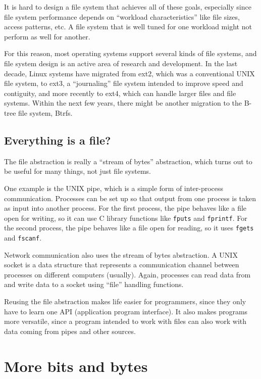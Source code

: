 \documentclass[12pt]{book}
\begin{document}
It is hard to design a file system that achieves all of these
goals, especially since file system performance depends on
``workload characteristics'' like file sizes, access
patterns, etc.  A file system that is well tuned for one workload
might not perform as well for another.

For this reason, most operating systems support several kinds of file
systems, and file system design is an active area of research and
development.  In the last decade, Linux systems have migrated
from ext2, which was a conventional UNIX file system, to ext3,
a ``journaling'' file system intended to improve speed and
contiguity, and more recently to ext4, which can handle larger files
and file systems.  Within the next few years, there might be
another migration to the B-tree file system, Btrfs.


\section{Everything is a file?}

The file abstraction is really a ``stream of bytes'' abstraction,
which turns out to be useful for many things, not just file systems.

One example is the UNIX pipe, which is a simple form of inter-process
communication.  Processes can be set up so that output from one
process is taken as input into another process.  For the first
process, the pipe behaves like a file open for writing, so it
can use C library functions like {\tt fputs} and {\tt fprintf}.
For the second process, the pipe behaves like a file open for
reading, so it uses {\tt fgets} and {\tt fscanf}.

Network communication also uses the stream of bytes abstraction.
A UNIX socket is a data structure that represents a communication
channel between processes on different computers (usually).  Again,
processes can read data from and write data to a socket using
``file'' handling functions.

Reusing the file abstraction makes life easier for programmers, since
they only have to learn one API (application program interface).
It also makes programs more versatile, since a program intended to
work with files can also work with data coming from pipes and other
sources.



\chapter{More bits and bytes}
\end{document}
